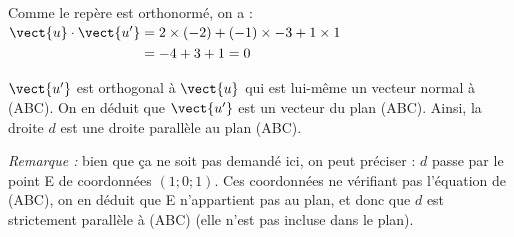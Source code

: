 \begin{enumerate}
	Comme le repère est orthonormé, on a :\quad $\begin{aligned}[t]
		\vect{u} \cdot \vect{u'} &= 2 \times (-2) + (- 1) \times -3 + 1  \times 1\\
		& = -4 + 3 + 1 = 0
	\end{aligned}$

	$\vect{u'}$ est orthogonal à $\vect{u}$ qui est lui-même un vecteur normal à (ABC). On en déduit que $\vect{u'}$ est un vecteur du plan (ABC). Ainsi, la droite $d$ est une droite parallèle au plan (ABC).

	\emph{Remarque :} bien que ça ne soit pas demandé ici, on peut préciser : $d$ passe par le point E de coordonnées $(1 ; 0 ; 1)$. Ces coordonnées ne vérifiant pas l'équation de (ABC), on en déduit que E n'appartient pas au plan, et donc que $d$ est strictement parallèle à (ABC) (elle n'est pas incluse dans le plan).
	\end{enumerate}
